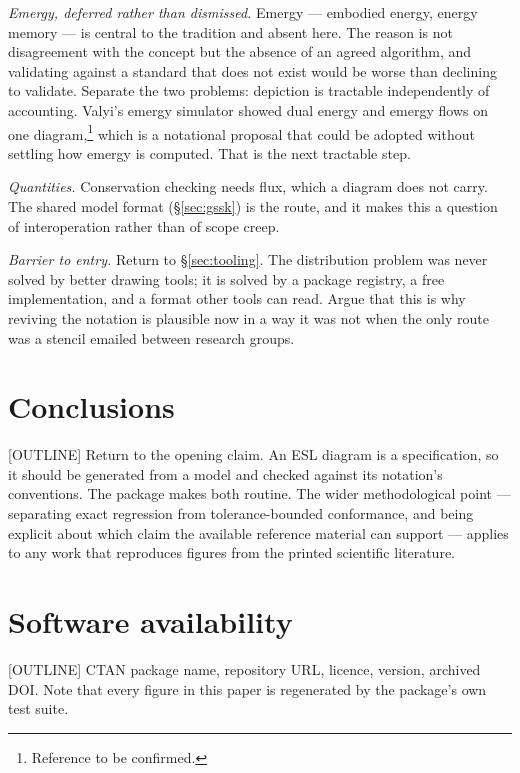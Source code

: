 \emph{Emergy, deferred rather than dismissed.} Emergy --- embodied energy,
energy memory --- is central to the tradition and absent here. The reason is not
disagreement with the concept but the absence of an agreed algorithm, and
validating against a standard that does not exist would be worse than declining
to validate. Separate the two problems: depiction is tractable independently of
accounting. Valyi's emergy simulator showed dual energy and emergy flows on one
diagram,\footnote{%
Reference to be confirmed.} which is a notational proposal that could be adopted
without settling how emergy is computed. That is the next tractable step.

\emph{Quantities.} Conservation checking needs flux, which a diagram does not
carry. The shared model format (\S\ref{sec:gssk}) is the route, and it makes
this a question of interoperation rather than of scope creep.

\emph{Barrier to entry.} Return to \S\ref{sec:tooling}. The distribution problem
was never solved by better drawing tools; it is solved by a package registry, a
free implementation, and a format other tools can read. Argue that this is why
reviving the notation is plausible now in a way it was not when the only route
was a stencil emailed between research groups.

\section{Conclusions}
\label{sec:conclusions}

[OUTLINE] Return to the opening claim. An ESL diagram is a specification, so it
should be generated from a model and checked against its notation's conventions.
The package makes both routine. The wider methodological point --- separating
exact regression from tolerance-bounded conformance, and being explicit about
which claim the available reference material can support --- applies to any work
that reproduces figures from the printed scientific literature.

\section*{Software availability}

[OUTLINE] CTAN package name, repository URL, licence, version, archived DOI.
Note that every figure in this paper is regenerated by the package's own test
suite.

